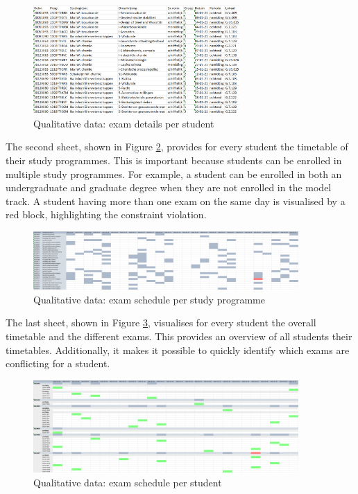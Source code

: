 \begin{figure}[H]
	\centering
	\includegraphics[width=0.7\textwidth]{images/excel/excel_sheet1.png} 
	\caption{Qualitative data: exam details per student}
	\label{fig:sheet1}
\end{figure}

The second sheet, shown in Figure \ref{fig:sheet2}, provides for every student the timetable of their study programmes. This is important because students can be enrolled in multiple study programmes. For example, a student can be enrolled in both an undergraduate and graduate degree when they are not enrolled in the model track. A student having more than one exam on the same day is visualised by a red block, highlighting the constraint violation.

\begin{figure}[H]
	\centering
	\includegraphics[width=0.9\textwidth]{images/excel/excel_sheet2.png} 
	\caption{Qualitative data: exam schedule per study programme}
	\label{fig:sheet2}
\end{figure}

The last sheet, shown in Figure \ref{fig:sheet3}, visualises for every student the overall timetable and the different exams. This provides an overview of all students their timetables. Additionally, it makes it possible to quickly identify which exams are conflicting for a student.

\begin{figure}[H]
	\centering
	\includegraphics[width=0.9\textwidth]{images/excel/excel_sheet3.png} 
	\caption{Qualitative data: exam schedule per student}
	\label{fig:sheet3}
\end{figure}

